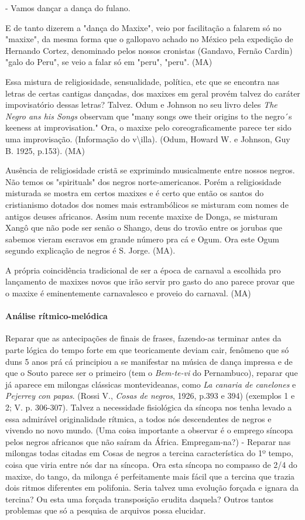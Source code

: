 - Vamos dançar a dança do fulano.

E de tanto dizerem a "dança do Maxixe", veio por facilitação a falarem
só no "maxixe", da mesma forma que o gallopavo achado no México pela
expedição de Hernando Cortez, denominado pelos nossos cronistas
(Gandavo, Fernão Cardin) "galo do Peru", se veio a falar só em "peru",
"peru". (MA)

Essa mistura de religiosidade, sensualidade, política, etc que se
encontra nas letras de certas cantigas dançadas, dos maxixes em geral
provém talvez do caráter impovisatório dessas letras? Talvez. Odum e
Johnson no seu livro deles \emph{The Negro ans his Songs} observam que
"many songs owe their origins to the negro´s keeness at improvisation."
Ora, o maxixe pelo coreograficamente parece ter sido uma improvisação.
(Informação do v\textbackslash{}illa). (Odum, Howard W. e Johnson, Guy
B. 1925, p.153). (MA)

Ausência de religiosidade cristã se exprimindo musicalmente entre nossos
negros. Não temos os "spirituals" dos negros norte-americanos. Porém a
religiosidade misturada se mostra em certos maxixes e é certo que então
os santos do cristianismo dotados dos nomes mais estrambólicos se
misturam com nomes de antigos deuses africanos. Assim num recente maxixe
de Donga, se misturam Xangô que não pode ser senão o Shango, deus do
trovão entre os jorubas que sabemos vieram escravos em grande número pra
cá e Ogum. Ora este Ogum segundo explicação de negros é S. Jorge. (MA).

A própria coincidência tradicional de ser a época de carnaval a
escolhida pro lançamento de maxixes novos que irão servir pro gasto do
ano parece provar que o maxixe é eminentemente carnavalesco e proveio do
carnaval. (MA)

\paragraph{Análise rítmico-melódica}

Reparar que as antecipações de finais de frases, fazendo-as terminar
antes da parte lógica do tempo forte em que teoricamente deviam cair,
fenômeno que só duns 5 anos prá cá principiou a se manifestar na música
de dança impressa e de que o Souto parece ser o primeiro (tem o
\emph{Bem-te-vi} do Pernambuco), reparar que já aparece em milongas
clássicas montevideanas, como \emph{La canaria de canelones} e
\emph{Pejerrey con papas}. (Rossi V., \emph{Cosas de negros}, 1926,
p.393 e 394) (exemplos 1 e 2; V. p. 306-307). Talvez a necessidade
fisiológica da síncopa nos tenha levado a essa admirável originalidade
rítmica, a todos nós descendentes de negros e vivendo no novo mundo.
(Uma coisa importante a observar é o emprego síncopa pelos negros
africanos que não saíram da África. Empregam-na?) - Reparar nas milongas
todas citadas em Cosas de negros a tercina característica do 1º tempo,
coisa que viria entre nós dar na síncopa. Ora esta síncopa no compasso
de 2/4 do maxixe, do tango, da milonga é perfeitamente mais fácil que a
tercina que trazia dois ritmos diferentes em polifonia. Seria talvez uma
evolução forçada e ignara da tercina? Ou esta uma forçada transposição
erudita daquela? Outros tantos problemas que só a pesquisa de arquivos
possa elucidar.

